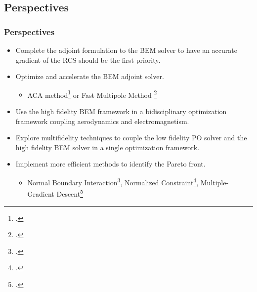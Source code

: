 \documentclass[beamer]{standalone}
\begin{document}
\subsection{Perspectives}
\begin{frame}
    \frametitle{Perspectives}

    \begin{itemize}[leftmargin=5mm,label=$\bullet$]
        \item Complete the adjoint formulation to the BEM solver to have an accurate gradient of the RCS should be the first priority.
        \item Optimize and accelerate the BEM adjoint solver.
        \begin{itemize}
            \item ACA method\footcite{Bebendorf2000} or Fast Multipole Method \footcite{Greengard1988}
        \end{itemize}
        \item Use the high fidelity BEM framework in a bidisciplinary optimization framework coupling aerodynamics and electromagnetism.
        \item Explore multifidelity techniques to couple the low fidelity PO solver and the high fidelity BEM solver in a single optimization framework.
        \item Implement more efficient methods to identify the Pareto front.
        \begin{itemize}
            \item Normal Boundary Interaction\footcite{Das1998}, Normalized Constraint\footcite{Messac2003}, Multiple-Gradient Descent\footcite{Desideri2012}
        \end{itemize}
    \end{itemize}
\end{frame}
\end{document}
